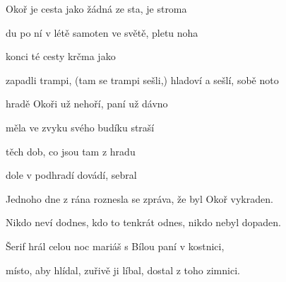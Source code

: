 

\zs
{} Okoř je cesta jako žádná ze sta,  je stroma

 du po ní v létě samoten ve světě,  pletu noha

 konci té cesty   krčma jako 

 zapadli trampi, (tam se trampi sešli,) hladoví a sešlí,  sobě noto
\ks

\zr
{} hradě Okoři  už nehoří,  paní  už dávno 

 měla ve zvyku  svého budíku   straší

 těch dob, co jsou tam   z hradu 

 dole v podhradí  dovádí,  sebral  
\kr

\zs
Jednoho dne z rána roznesla se zpráva, že byl Okoř vykraden.

Nikdo neví dodnes, kdo to tenkrát odnes, nikdo nebyl dopaden.

Šerif hrál celou noc mariáš s Bílou paní v kostnici,

místo, aby hlídal, zuřivě ji líbal, dostal z toho zimnici.
\ks

\zr \kr

\kp
